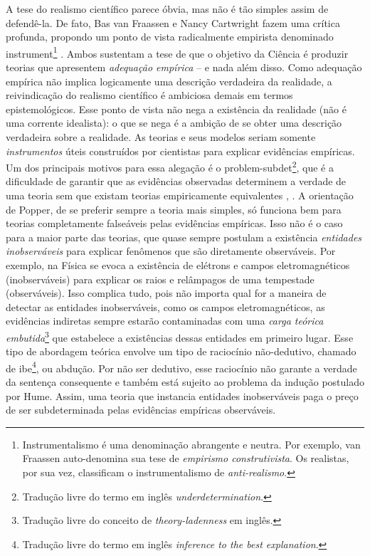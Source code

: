 \documentclass[./main.tex]{subfiles}
\begin{document}
\par A tese do realismo científico parece óbvia, mas não é tão simples assim de defendê-la. De fato, Bas van Fraassen \cite{bas1980} e Nancy Cartwright \cite{nancy1983} fazem uma crítica profunda, propondo um ponto de vista radicalmente empirista denominado \gls{instrument}\footnote{Instrumentalismo é uma denominação  abrangente e neutra. Por exemplo, van Fraassen auto-denomina sua tese de \textit{empirismo construtivista}. Os realistas, por sua vez, classificam o instrumentalismo de \textit{anti-realismo}.} \cite{sep-constructive-empiricism}. Ambos sustentam a tese de que o objetivo da Ciência é produzir teorias que apresentem \textit{adequação empírica} -- e nada além disso. Como adequação empírica não implica logicamente uma descrição verdadeira da realidade, a reivindicação do realismo científico é ambiciosa demais em termos epistemológicos. Esse ponto de vista não nega a existência da realidade (não é uma corrente idealista): o que se nega é a ambição de se obter uma descrição verdadeira sobre a realidade. As teorias e seus modelos seriam somente \textit{instrumentos} úteis construídos por cientistas para explicar evidências empíricas. Um dos principais motivos para essa alegação é o \gls{problem-subdet}\footnote{Tradução livre do termo em inglês \textit{underdetermination}.}, que é a dificuldade de garantir que as evidências observadas determinem a verdade de uma teoria sem que existam teorias empiricamente equivalentes \cite{sep-scientific-underdet}, \cite{Tulodziecki2017}. A orientação de Popper, de se preferir sempre a teoria mais simples, só funciona bem para teorias completamente falseáveis pelas evidências empíricas. Isso não é o caso para a maior parte das teorias, que quase sempre postulam a existência \textit{entidades inobserváveis} para explicar fenômenos que são diretamente observáveis. Por exemplo, na Física se evoca a existência de elétrons e campos eletromagnéticos (inobserváveis) para explicar os raios e relâmpagos de uma tempestade (observáveis). Isso complica tudo, pois não importa qual for a maneira de detectar as entidades inobserváveis, como os campos eletromagnéticos, as evidências indiretas sempre estarão contaminadas com uma \textit{carga teórica embutida}\footnote{Tradução livre do conceito de \textit{theory-ladenness} em inglês.} que estabelece a existências dessas entidades em primeiro lugar. Esse tipo de abordagem teórica envolve um tipo de raciocínio não-dedutivo, chamado de \gls{ibe}\footnote{Tradução livre do termo em inglês \textit{inference to the best explanation}.}, ou abdução. Por não ser dedutivo, esse raciocínio não garante a verdade da sentença consequente e também está sujeito ao problema da indução postulado por Hume. Assim, uma teoria que instancia entidades inobserváveis paga o preço de ser subdeterminada pelas evidências empíricas observáveis.
\end{document}
